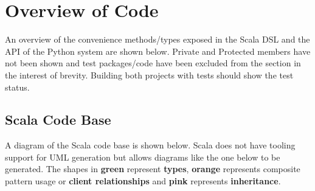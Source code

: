 \documentclass[12pt]{article}
\begin{document}
\section{Overview of Code}

An overview of the convenience methods/types exposed in the Scala DSL and the API of the Python system are shown below. Private and Protected members have not been shown and test packages/code have been excluded from the section in the interest of brevity. Building both projects with tests should show the test status.

\subsection{Scala Code Base}
A diagram of the Scala code base is shown below. Scala does not have tooling support for UML generation but allows diagrams like the one below to be generated. The shapes in \textbf{green} represent \textbf{types}, \textbf{orange} represents composite pattern usage or \textbf{client relationships} and \textbf{pink} represents \textbf{inheritance}.
\end{document}
